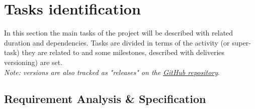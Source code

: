 \section{Tasks identification}
In this section the main tasks of the project will be described with related duration and dependencies. Tasks are divided in terms of the activity (or super-task) they are related to and some milestones, described with deliveries versioning) are set.\\
\textit{Note: versions are also tracked as "releases" on the \href{https://github.com/zsimo93/myTaxyServiceTVZ}{GitHub repository}}. \\

\subsection{Requirement Analysis \& Specification}
